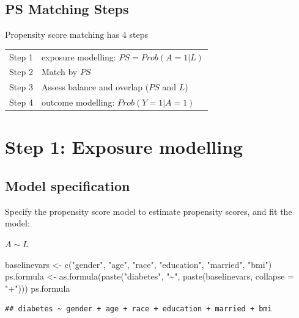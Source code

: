 \documentclass[
]{book}
\newenvironment{Shaded}{\begin{snugshade}}{\end{snugshade}}
\newcommand{\AttributeTok}[1]{\textcolor[rgb]{0.77,0.63,0.00}{#1}}
\newcommand{\FunctionTok}[1]{\textcolor[rgb]{0.00,0.00,0.00}{#1}}
\newcommand{\NormalTok}[1]{#1}
\newcommand{\OtherTok}[1]{\textcolor[rgb]{0.56,0.35,0.01}{#1}}
\newcommand{\StringTok}[1]{\textcolor[rgb]{0.31,0.60,0.02}{#1}}
\begin{document}
\hypertarget{ps-matching-steps}{%
\section{PS Matching Steps}\label{ps-matching-steps}}

Propensity score matching has 4 steps \citep{austin2011tutorial}

\begin{longtable}[]{@{}ll@{}}
\toprule
\endhead
Step 1 & exposure modelling: \(PS = Prob(A=1|L)\)\tabularnewline
Step 2 & Match by \(PS\)\tabularnewline
Step 3 & Assess balance and overlap (\(PS\) and \(L\))\tabularnewline
Step 4 & outcome modelling: \(Prob(Y=1|A=1)\)\tabularnewline
\bottomrule
\end{longtable}

\hypertarget{s1}{%
\chapter{Step 1: Exposure modelling}\label{s1}}

\hypertarget{model-specification}{%
\section{Model specification}\label{model-specification}}

Specify the propensity score model to estimate propensity scores, and fit the model:

\(A \sim L\)

\begin{Shaded}
\begin{Highlighting}[]
\NormalTok{baselinevars }\OtherTok{\textless{}{-}} \FunctionTok{c}\NormalTok{(}\StringTok{"gender"}\NormalTok{, }\StringTok{"age"}\NormalTok{, }\StringTok{"race"}\NormalTok{, }\StringTok{"education"}\NormalTok{, }\StringTok{"married"}\NormalTok{, }\StringTok{"bmi"}\NormalTok{)}
\NormalTok{ps.formula }\OtherTok{\textless{}{-}} \FunctionTok{as.formula}\NormalTok{(}\FunctionTok{paste}\NormalTok{(}\StringTok{"diabetes"}\NormalTok{, }\StringTok{"\textasciitilde{}"}\NormalTok{, }\FunctionTok{paste}\NormalTok{(baselinevars, }\AttributeTok{collapse =} \StringTok{"+"}\NormalTok{)))}
\NormalTok{ps.formula}
\end{Highlighting}
\end{Shaded}

\begin{verbatim}
## diabetes ~ gender + age + race + education + married + bmi
\end{verbatim}
\end{document}
